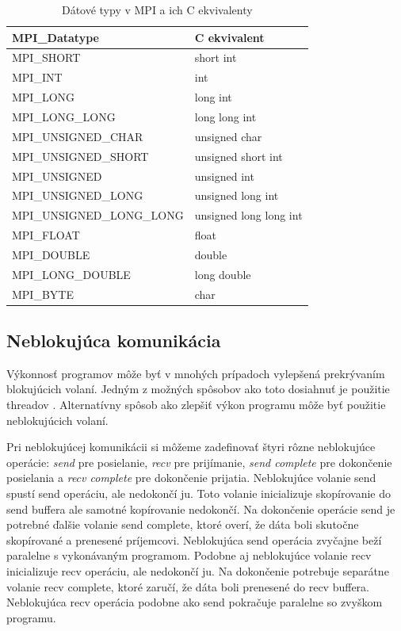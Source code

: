 \begin{table}[!h]
\centering
\begin{tabular}{@{}ll@{}}
\toprule
\textbf{MPI\_Datatype}    & \textbf{C ekvivalent}  \\ \midrule
MPI\_SHORT                & short int              \\
MPI\_INT                  & int                    \\
MPI\_LONG                 & long int               \\
MPI\_LONG\_LONG           & long long int          \\
MPI\_UNSIGNED\_CHAR       & unsigned char          \\
MPI\_UNSIGNED\_SHORT      & unsigned short int     \\
MPI\_UNSIGNED             & unsigned int           \\
MPI\_UNSIGNED\_LONG       & unsigned long int      \\
MPI\_UNSIGNED\_LONG\_LONG & unsigned long long int \\
MPI\_FLOAT                & float                  \\
MPI\_DOUBLE               & double                 \\
MPI\_LONG\_DOUBLE         & long double            \\
MPI\_BYTE                 & char                   \\ \bottomrule
\end{tabular}
\caption{Dátové typy v MPI a ich C ekvivalenty}
\label{tab:mpi-datatypes}
\end{table}

\subsection{Neblokujúca komunikácia}
Výkonnosť programov môže byť v mnohých prípadoch vylepšená prekrývaním blokujúcich volaní.
Jedným z možných spôsobov ako toto dosiahnuť je použitie threadov \cite{mpi3-1}.
Alternatívny spôsob ako zlepšiť výkon programu môže byť použitie neblokujúcich volaní.

Pri neblokujúcej komunikácii si môžeme zadefinovať štyri rôzne neblokujúce operácie: \textit{send} pre posielanie,
\textit{recv} pre prijímanie, \textit{send complete} pre dokončenie posielania a \textit{recv complete} pre dokončenie prijatia.
Neblokujúce volanie send spustí send operáciu, ale nedokončí ju.
Toto volanie inicializuje skopírovanie do send buffera ale samotné kopírovanie nedokončí.
Na dokončenie operácie send je potrebné ďalšie volanie send complete,
ktoré overí, že dáta boli skutočne skopírované a prenesené príjemcovi.
Neblokujúca send operácia zvyčajne beží paralelne s vykonávaným programom.
Podobne aj neblokujúce volanie recv inicializuje recv operáciu, ale nedokončí ju. Na dokončenie potrebuje separátne volanie recv complete,
ktoré zaručí, že dáta boli prenesené do recv buffera. Neblokujúca recv operácia podobne ako send pokračuje paralelne so zvyškom programu.


